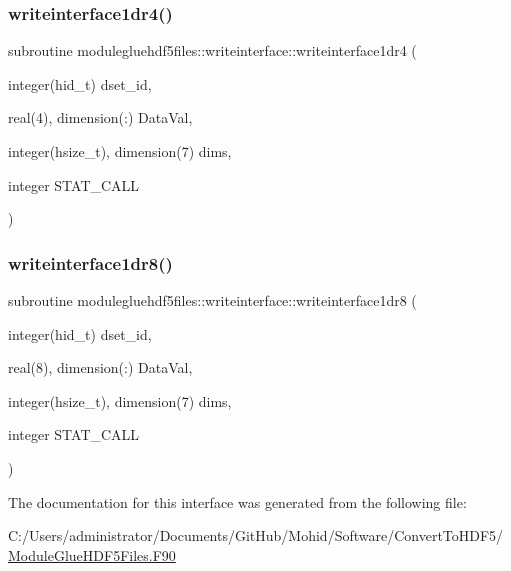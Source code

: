\subsubsection{\texorpdfstring{writeinterface1dr4()}{writeinterface1dr4()}}
{\footnotesize\ttfamily subroutine modulegluehdf5files\+::writeinterface\+::writeinterface1dr4 (\begin{DoxyParamCaption}\item[{integer(hid\+\_\+t)}]{dset\+\_\+id,  }\item[{real(4), dimension(\+:)}]{Data\+Val,  }\item[{integer(hsize\+\_\+t), dimension(7)}]{dims,  }\item[{integer}]{S\+T\+A\+T\+\_\+\+C\+A\+LL }\end{DoxyParamCaption})\hspace{0.3cm}{\ttfamily [private]}}

\mbox{\label{interfacemodulegluehdf5files_1_1writeinterface_a6790993ebedbaf8a83ce1cf1fc896e0a}} 
\subsubsection{\texorpdfstring{writeinterface1dr8()}{writeinterface1dr8()}}
{\footnotesize\ttfamily subroutine modulegluehdf5files\+::writeinterface\+::writeinterface1dr8 (\begin{DoxyParamCaption}\item[{integer(hid\+\_\+t)}]{dset\+\_\+id,  }\item[{real(8), dimension(\+:)}]{Data\+Val,  }\item[{integer(hsize\+\_\+t), dimension(7)}]{dims,  }\item[{integer}]{S\+T\+A\+T\+\_\+\+C\+A\+LL }\end{DoxyParamCaption})\hspace{0.3cm}{\ttfamily [private]}}



The documentation for this interface was generated from the following file\+:\begin{DoxyCompactItemize}
\item 
C\+:/\+Users/administrator/\+Documents/\+Git\+Hub/\+Mohid/\+Software/\+Convert\+To\+H\+D\+F5/\mbox{\hyperlink{_module_glue_h_d_f5_files_8_f90}{Module\+Glue\+H\+D\+F5\+Files.\+F90}}\end{DoxyCompactItemize}
